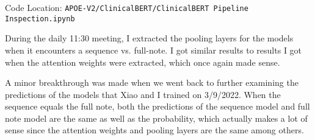 \documentclass[11pt,letterpaper]{article}
\begin{document}
Code Location: \texttt{APOE-V2/ClinicalBERT/ClinicalBERT Pipeline Inspection.ipynb}

During the daily 11:30 meeting, I extracted the pooling layers for the models when it encounters a sequence vs. full-note. I got similar results to results I got when the attention weights were extracted, which once again made sense.

A minor breakthrough was made when we went back to further examining the predictions of the models that Xiao and I trained on 3/9/2022. When the sequence equals the full note, both the predictions of the sequence model and full note model are the same as well as the probability, which actually makes a lot of sense since the attention weights and pooling layers are the same among others. 
\end{document}
